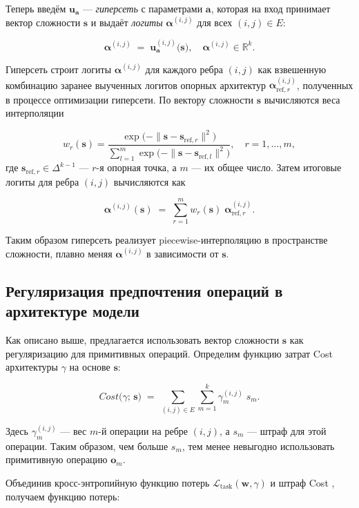 \documentclass{article}
\begin{document}
Теперь введём $\boldsymbol{u}_{\boldsymbol a}$ --- \textit{гиперсеть} с параметрами $\boldsymbol a$, которая на вход принимает вектор сложности $\boldsymbol{s}$ и выдаёт \textit{логиты} $\boldsymbol{\alpha}^{(i,j)}$ для всех $(i,j)\in E$:

$$
    \boldsymbol\alpha^{(i,j)} \;=\; \boldsymbol u_{\boldsymbol a}^{(i,j)}\bigl(\boldsymbol{s}\bigr), 
    \quad
    \boldsymbol\alpha^{(i,j)} \in \mathbb R^k.
$$

Гиперсеть строит логиты $\boldsymbol\alpha^{(i,j)}$ для каждого ребра $(i,j)$ как взвешенную комбинацию заранее выученных логитов опорных архитектур $\boldsymbol\alpha_{\text{ref},r}^{(i,j)}$, полученных в процессе оптимизации гиперсети. По вектору сложности $\boldsymbol{s}$ вычисляются веса интерполяции

$$
  w_r(\boldsymbol{s})
  =  
  \frac{\exp\bigl(-\|\boldsymbol{s} - \boldsymbol{s}_{\text{ref},r}\|^2\bigr)}
       {\displaystyle\sum_{l=1}^{m}\exp\bigl(-\|\boldsymbol{s} - \boldsymbol{s}_{\text{ref},l}\|^2\bigr)},
  \quad
  r = 1,\dots,m,
$$
где $\boldsymbol{s}_{\text{ref},r}\in\Delta^{k-1}$ — $r$-я опорная точка, а $m$ — их общее число. Затем итоговые логиты для ребра $(i,j)$ вычисляются как

$$
  \boldsymbol\alpha^{(i,j)}(\boldsymbol{s})
  \;=\;
  \sum_{r=1}^{m} w_r(\boldsymbol{s})\;\boldsymbol\alpha_{\text{ref},r}^{(i,j)}.
$$

Таким образом гиперсеть реализует piecewise-интерполяцию в пространстве сложности, плавно меняя $\boldsymbol\alpha^{(i,j)}$ в зависимости от $\boldsymbol{s}$.

\subsection{Регуляризация предпочтения операций в архитектуре модели}

Как описано выше, предлагается использовать вектор сложности $\boldsymbol{s}$ как регуляризацию для примитивных операций. Определим функцию затрат Cost архитектуры $\gamma$ на основе $\boldsymbol{s}$:

$$
    Cost\bigl(\gamma;\,\boldsymbol{s}\bigr)
    \;=\; 
    \sum_{(i,j)\in E} \sum_{m=1}^k 
    \gamma^{(i,j)}_m \;s_m.
$$

Здесь $\gamma^{(i,j)}_m$ --- вес $m$-й операции на ребре $(i,j)$, а $s_m$ — штраф для этой операции. Таким образом, чем больше $s_m$, тем менее невыгодно использовать примитивную операцию $\boldsymbol o_m$.

Объединив кросс-энтропийную функцию потерь $\mathcal L_{\mathrm{task}}(\boldsymbol w,\gamma)$ и штраф Cost , получаем функцию потерь:
\end{document}
